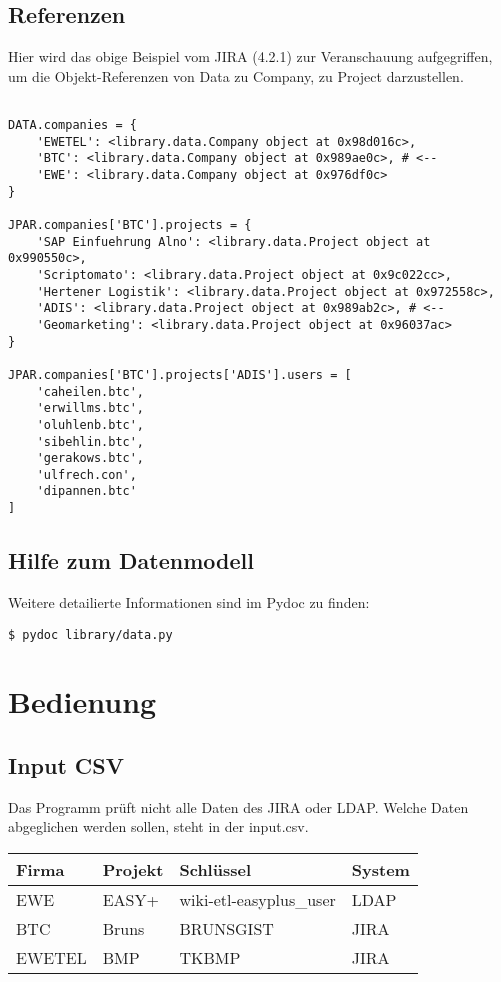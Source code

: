 \documentclass[a4paper,12pt]{report}
\begin{document}
	\section{Referenzen}
	Hier wird das obige Beispiel vom JIRA (4.2.1) zur Veranschauung aufgegriffen, um die Objekt-Referenzen von Data zu Company, zu Project darzustellen.
	
	\begin{lstlisting}

DATA.companies = {
	'EWETEL': <library.data.Company object at 0x98d016c>,
	'BTC': <library.data.Company object at 0x989ae0c>, # <--
	'EWE': <library.data.Company object at 0x976df0c>
}

JPAR.companies['BTC'].projects = {
	'SAP Einfuehrung Alno': <library.data.Project object at 0x990550c>,
	'Scriptomato': <library.data.Project object at 0x9c022cc>,
	'Hertener Logistik': <library.data.Project object at 0x972558c>,
	'ADIS': <library.data.Project object at 0x989ab2c>, # <--
	'Geomarketing': <library.data.Project object at 0x96037ac>
}

JPAR.companies['BTC'].projects['ADIS'].users = [
	'caheilen.btc',
	'erwillms.btc',
	'oluhlenb.btc',
	'sibehlin.btc',
	'gerakows.btc',
	'ulfrech.con',
	'dipannen.btc'
]
	\end{lstlisting}	
	
	\section{Hilfe zum Datenmodell}
	Weitere detailierte Informationen sind im Pydoc zu finden:
	\begin{lstlisting}
$ pydoc library/data.py
	\end{lstlisting}

\chapter{Bedienung}
	\section{Input CSV}
	Das Programm prüft nicht alle Daten des JIRA oder LDAP. Welche Daten abgeglichen werden sollen, steht in der input.csv.\\	
	
	\begin{tabularx}{\textwidth}{ |l|R|l|R| }
		\hline
		{\bf Firma} & {\bf Projekt} & {\bf Schlüssel} & {\bf System} \\
		\hline
		EWE & EASY+ & wiki-etl-easyplus\_user & LDAP \\
		\hline
		BTC & Bruns & BRUNSGIST & JIRA \\
		\hline
		EWETEL & BMP & TKBMP & JIRA \\
		\hline
	\end{tabularx}\linebreak\linebreak
	
\end{document}
